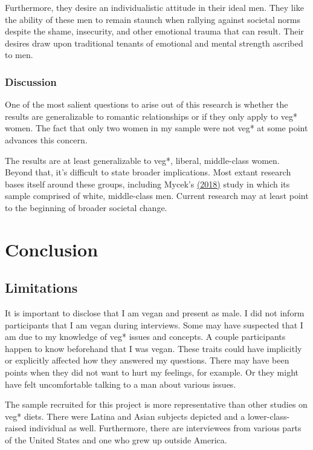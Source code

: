 \documentclass[twoside]{report}
\let\oldsection\section
\renewcommand\section{\clearpage\oldsection}
\begin{document}
\begin{multicols*}{2}
Furthermore, they desire an individualistic attitude in their ideal men. They like the ability of these men to remain staunch when rallying against societal norms despite the shame, insecurity, and other emotional trauma that can result. Their desires draw upon traditional tenants of emotional and
mental strength ascribed to men.

\subsubsection{Discussion}

One of the most salient questions to arise out of this research is
whether the results are generalizable to romantic relationships or if
they only apply to veg* women. The fact that only two women in my sample
were not veg* at some point advances this concern.

The results are at least generalizable to veg*, liberal, middle-class
women. Beyond that, it's difficult to state broader implications. Most extant
research bases itself around these groups, including Mycek's \hyperlink{mycek}{(2018)} study in which its sample comprised of white, middle-class men. Current research may at least point to the beginning of broader societal change.

\section{Conclusion}
\subsection{Limitations}

It is important to disclose that I am vegan and present as male.
I did not inform participants that I am vegan during interviews. Some
may have suspected that I am due to my knowledge of veg* issues and
concepts. A couple participants happen to know beforehand that I was
vegan. These traits could have implicitly or explicitly affected how they answered my questions. There may have been points when they did not want to hurt my feelings, for example. Or they might have felt uncomfortable talking to a man about various issues.

The sample recruited for this project is more representative than other
studies on veg* diets. There were Latina and Asian subjects depicted and
a lower-class-raised individual as well. Furthermore, there are
interviewees from various parts of the United States and one
who grew up outside America.


\end{multicols*}
\end{document}
